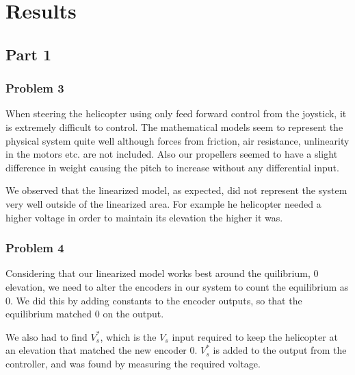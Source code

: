 \section{Results}


\subsection{Part 1}


\subsubsection{Problem 3}
When steering the helicopter using only feed forward control from the joystick, it is extremely difficult to control. The mathematical models seem to represent the physical system quite well although forces from friction, air resistance, unlinearity in the motors etc. are not included. Also our propellers seemed to have a slight difference in weight causing the pitch to increase without any differential input.

We observed that the linearized model, as expected, did not represent the system very well outside of the linearized area. For example he helicopter needed a higher voltage in order to maintain its elevation the higher it was. 



\subsubsection{Problem 4}
Considering that our linearized model works best around the quilibrium, $0$ elevation, we need to alter the encoders in our system to count the equilibrium as $0$. We did this by adding constants to the encoder outputs, so that the equilibrium matched $0$ on the output.

We also had to find $V_s^\ast$, which is the $V_s$ input required to keep the helicopter at an elevation that matched the new encoder $0$. $V_s^\ast$ is added to the output from the controller, and was found by measuring the required voltage.


